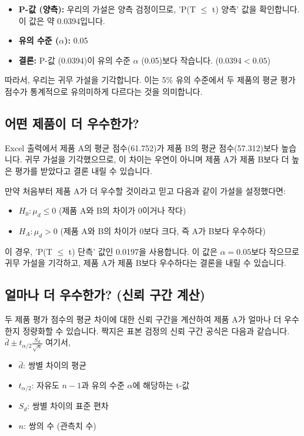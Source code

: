 \documentclass[11pt,a4paper]{book}
\theoremstyle{definition}
\begin{document}
\begin{itemize}
    \item \textbf{P-값 (양측):} 우리의 가설은 양측 검정이므로, 'P(T $\le$ t) 양측' 값을 확인합니다. 이 값은 약 0.0394입니다.
    \item \textbf{유의 수준 ($\alpha$):} 0.05
    \item \textbf{결론:} P-값 (0.0394)이 유의 수준 $\alpha$ (0.05)보다 작습니다. ($0.0394 < 0.05$)
\end{itemize}
따라서, 우리는 귀무 가설을 기각합니다. 이는 5\% 유의 수준에서 두 제품의 평균 평가 점수가 통계적으로 유의미하게 다르다는 것을 의미합니다.

\subsection{어떤 제품이 더 우수한가?}
Excel 출력에서 제품 A의 평균 점수(61.752)가 제품 B의 평균 점수(57.312)보다 높습니다. 귀무 가설을 기각했으므로, 이 차이는 우연이 아니며 제품 A가 제품 B보다 더 높은 평가를 받았다고 결론 내릴 수 있습니다.

\begin{examplebox}[title=단측 검정으로 가설을 설정했다면?]
만약 처음부터 제품 A가 더 우수할 것이라고 믿고 다음과 같이 가설을 설정했다면:
\begin{itemize}
    \item $H_0: \mu_d \le 0$ (제품 A와 B의 차이가 0이거나 작다)
    \item $H_A: \mu_d > 0$ (제품 A와 B의 차이가 0보다 크다, 즉 A가 B보다 우수하다)
\end{itemize}
이 경우, 'P(T $\le$ t) 단측' 값인 0.0197을 사용합니다. 이 값은 $\alpha=0.05$보다 작으므로 귀무 가설을 기각하고, 제품 A가 제품 B보다 우수하다는 결론을 내릴 수 있습니다.
\end{examplebox}

\subsection{얼마나 더 우수한가? (신뢰 구간 계산)}
두 제품 평가 점수의 평균 차이에 대한 신뢰 구간을 계산하여 제품 A가 얼마나 더 우수한지 정량화할 수 있습니다. 짝지은 표본 검정의 신뢰 구간 공식은 다음과 같습니다.
$\bar{d} \pm t_{\alpha/2} \frac{S_d}{\sqrt{n}}$
여기서,
\begin{itemize}
    \item $\bar{d}$: 쌍별 차이의 평균
    \item $t_{\alpha/2}$: 자유도 $n-1$과 유의 수준 $\alpha$에 해당하는 t-값
    \item $S_d$: 쌍별 차이의 표준 편차
    \item $n$: 쌍의 수 (관측치 수)
\end{itemize}
\end{document}
